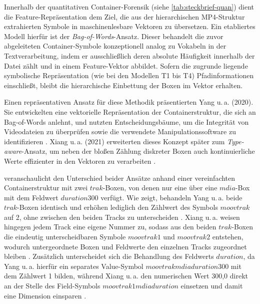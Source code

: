 Innerhalb der quantitativen Container-Forensik (siehe \ref{tab:steckbrief-quan}) dient die Feature-Repräsentation dem Ziel, die aus der hierarchischen MP4-Struktur extrahierten Symbole in maschinenlesbare Vektoren zu übersetzen. Ein etabliertes Modell hierfür ist der \textit{Bag-of-Words}-Ansatz. Dieser behandelt die zuvor abgeleiteten Container-Symbole konzeptionell analog zu Vokabeln in der Textverarbeitung, indem er ausschließlich deren absolute Häufigkeit innerhalb der Datei zählt und in einem Feature-Vektor abbildet. Sofern die zugrunde liegende symbolische Repräsentation (wie bei den Modellen T1 bis T4) Pfadinformationen einschließt, bleibt die hierarchische Einbettung der Boxen im Vektor erhalten.

Einen repräsentativen Ansatz für diese Methodik präsentierten Yang u.\,a. (2020). Sie entwickelten eine vektorielle Repräsentation der Containerstruktur, die sich an Bag-of-Words anlehnt, und nutzten Entscheidungsbäume, um die Integrität von Videodateien zu überprüfen sowie die verwendete Manipulationssoftware zu identifizieren \cite{yang_efficient_2020}. Xiang u.\,a. (2021) erweiterten dieses Konzept später zum \textit{Type-aware}-Ansatz, um neben der bloßen Zählung diskreter Boxen auch kontinuierliche Werte effizienter in den Vektoren zu verarbeiten \cite{xiang_forensic_2021}.

 veranschaulicht den Unterschied beider Ansätze anhand einer vereinfachten Containerstruktur mit zwei \(trak\)-Boxen, von denen nur eine über eine \(mdia\)-Box mit dem Feldwert \(duration300\) verfügt. Wie  zeigt, behandeln Yang u.\,a. beide \(trak\)-Boxen identisch und erhöhen lediglich den Zählwert des Symbols \(moovtrak\) auf 2, ohne zwischen den beiden Tracks zu unterscheiden \cite[Kap. 3]{yang_efficient_2020}. Xiang u.\,a. weisen hingegen jedem Track eine eigene Nummer zu, sodass aus den beiden \(trak\)-Boxen die eindeutig unterscheidbaren Symbole \(moovtrak1\) und \(moovtrak2\) entstehen, wodurch untergeordnete Boxen und Feldwerte den einzelnen Tracks zugeordnet bleiben \cite[Kap. 3.3]{xiang_forensic_2021}. Zusätzlich unterscheidet sich die Behandlung des Feldwerts \(duration\), da Yang u.\,a. hierfür ein separates Value-Symbol \(moovtrakmdiaduration300\) mit dem Zählwert 1 bilden, während Xiang u.\,a. den numerischen Wert 300,0 direkt an der Stelle des Field-Symbols \(moovtrak1mdiaduration\) einsetzen und damit eine Dimension einsparen \cite[Kap. 3.3]{xiang_forensic_2021}.

